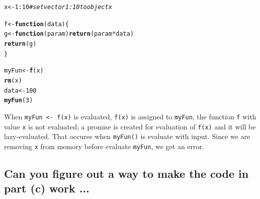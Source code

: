 \documentclass{article}\usepackage[]{graphicx}\usepackage[]{color}
\makeatletter
\newcommand{\hlnum}[1]{\textcolor[rgb]{0.686,0.059,0.569}{#1}}%
\newcommand{\hlcom}[1]{\textcolor[rgb]{0.678,0.584,0.686}{\textit{#1}}}%
\newcommand{\hlopt}[1]{\textcolor[rgb]{0,0,0}{#1}}%
\newcommand{\hlstd}[1]{\textcolor[rgb]{0.345,0.345,0.345}{#1}}%
\newcommand{\hlkwa}[1]{\textcolor[rgb]{0.161,0.373,0.58}{\textbf{#1}}}%
\newcommand{\hlkwb}[1]{\textcolor[rgb]{0.69,0.353,0.396}{#1}}%
\newcommand{\hlkwc}[1]{\textcolor[rgb]{0.333,0.667,0.333}{#1}}%
\newcommand{\hlkwd}[1]{\textcolor[rgb]{0.737,0.353,0.396}{\textbf{#1}}}%
\newenvironment{kframe}{%
 \def\at@end@of@kframe{}%
 \ifinner\ifhmode%
  \def\at@end@of@kframe{\end{minipage}}%
  \begin{minipage}{\columnwidth}%
 \fi\fi%
 \def\FrameCommand##1{\hskip\@totalleftmargin \hskip-\fboxsep
 \colorbox{shadecolor}{##1}\hskip-\fboxsep
     \hskip-\linewidth \hskip-\@totalleftmargin \hskip\columnwidth}%
 \MakeFramed {\advance\hsize-\width
   \@totalleftmargin\z@ \linewidth\hsize
   \@setminipage}}%
 {\par\unskip\endMakeFramed%
 \at@end@of@kframe}
\newenvironment{knitrout}{}{} %
\makeatother
\begin{document}
\begin{knitrout}
\color{fgcolor}\begin{kframe}
\begin{alltt}
\hlstd{x} \hlkwb{<-} \hlnum{1}\hlopt{:}\hlnum{10}     \hlcom{#set vector 1:10 to object x                  }

\hlstd{f} \hlkwb{<-} \hlkwa{function}\hlstd{(}\hlkwc{data}\hlstd{)\{}
    \hlstd{g} \hlkwb{<-} \hlkwa{function}\hlstd{(}\hlkwc{param}\hlstd{)} \hlkwd{return}\hlstd{(param} \hlopt{*} \hlstd{data)}
    \hlkwd{return}\hlstd{(g)}
\hlstd{\}}

\hlstd{myFun} \hlkwb{<-} \hlkwd{f}\hlstd{(x)}
\hlkwd{rm}\hlstd{(x)}
\hlstd{data} \hlkwb{<-} \hlnum{100}
\hlkwd{myFun}\hlstd{(}\hlnum{3}\hlstd{)}
\end{alltt}


{\ttfamily\noindent\bfseries\color{errorcolor}{\#\# Error in myFun(3): object 'x' not found}}\end{kframe}
\end{knitrout}

When \texttt{myFun <- f(x)} is evaluated, \texttt{f(x)} is assigned to \texttt{myFun}, the function \texttt{f} with value \texttt{x} is not evaluated; a promise is created for evaluation of \texttt{f(x)} and it will be lazy-evaluated. That occures when \texttt{myFun()} is evaluate with input. Since we are removing \texttt{x} from memory before evaluate \texttt{myFun}, we get an error.

\subsection{Can you figure out a way to make the code in part (c) work ...} %
\end{document}
